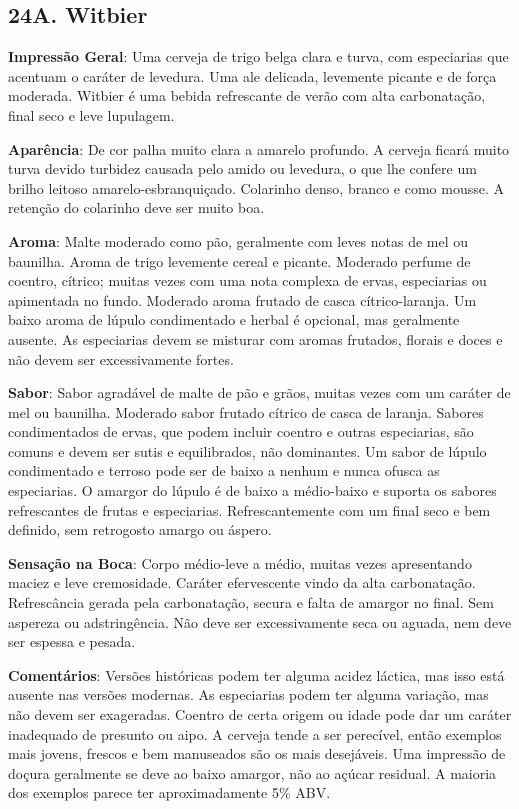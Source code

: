\subsection*{24A. Witbier}
\textbf{Impressão Geral}: Uma cerveja de trigo belga clara e turva, com especiarias que acentuam o caráter de levedura. Uma ale delicada, levemente picante e de força moderada. Witbier é uma bebida refrescante de verão com alta carbonatação, final seco e leve lupulagem.

\textbf{Aparência}: De cor palha muito clara a amarelo profundo. A cerveja ficará muito turva devido turbidez causada pelo amido ou levedura, o que lhe confere um brilho leitoso amarelo-esbranquiçado. Colarinho denso, branco e como mousse. A retenção do colarinho deve ser muito boa.

\textbf{Aroma}: Malte moderado como pão, geralmente com leves notas de mel ou baunilha. Aroma de trigo levemente cereal e picante. Moderado perfume de coentro, cítrico; muitas vezes com uma nota complexa de ervas, especiarias ou apimentada no fundo. Moderado aroma frutado de casca cítrico-laranja. Um baixo aroma de lúpulo condimentado e herbal é opcional, mas geralmente ausente. As especiarias devem se misturar com aromas frutados, florais e doces e não devem ser excessivamente fortes.

\textbf{Sabor}: Sabor agradável de malte de pão e grãos, muitas vezes com um caráter de mel ou baunilha. Moderado sabor frutado cítrico de casca de laranja. Sabores condimentados de ervas, que podem incluir coentro e outras especiarias, são comuns e devem ser sutis e equilibrados, não dominantes. Um sabor de lúpulo condimentado e terroso pode ser de baixo a nenhum e nunca ofusca as especiarias. O amargor do lúpulo é de baixo a médio-baixo e suporta os sabores refrescantes de frutas e especiarias. Refrescantemente com um final seco e bem definido, sem retrogosto amargo ou áspero.

\textbf{Sensação na Boca}: Corpo médio-leve a médio, muitas vezes apresentando maciez e leve cremosidade. Caráter efervescente vindo da alta carbonatação. Refrescância gerada pela carbonatação, secura e falta de amargor no final. Sem aspereza ou adstringência. Não deve ser excessivamente seca ou aguada, nem deve ser espessa e pesada.

\textbf{Comentários}: Versões históricas podem ter alguma acidez láctica, mas isso está ausente nas versões modernas. As especiarias podem ter alguma variação, mas não devem ser exageradas. Coentro de certa origem ou idade pode dar um caráter inadequado de presunto ou aipo. A cerveja tende a ser perecível, então exemplos mais jovens, frescos e bem manuseados são os mais desejáveis. Uma impressão de doçura geralmente se deve ao baixo amargor, não ao açúcar residual. A maioria dos exemplos parece ter aproximadamente 5\% ABV.

